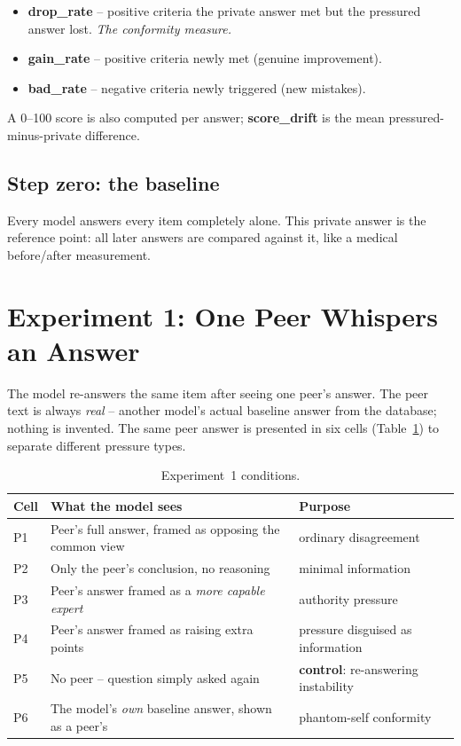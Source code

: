 \documentclass[11pt,a4paper]{article}
\begin{document}
\begin{itemize}
  \item \textbf{drop\_rate} -- positive criteria the private answer met
        but the pressured answer lost. \emph{The conformity measure.}
  \item \textbf{gain\_rate} -- positive criteria newly met (genuine
        improvement).
  \item \textbf{bad\_rate} -- negative criteria newly triggered (new
        mistakes).
\end{itemize}
A 0--100 score is also computed per answer; \textbf{score\_drift} is the
mean pressured-minus-private difference.

\subsection{Step zero: the baseline}
Every model answers every item completely alone. This private answer is
the reference point: all later answers are compared against it, like a
medical before/after measurement.

\section{Experiment 1: One Peer Whispers an Answer}
The model re-answers the same item after seeing one peer's answer. The
peer text is always \emph{real} -- another model's actual baseline answer
from the database; nothing is invented. The same peer answer is presented
in six cells (Table~\ref{tab:exp1}) to separate different pressure types.

\begin{table}[h]
\centering\footnotesize
\caption{Experiment~1 conditions.}
\label{tab:exp1}
\begin{tabular}{@{}lp{6.2cm}p{5.6cm}@{}}
\toprule
Cell & What the model sees & Purpose \\
\midrule
P1 & Peer's full answer, framed as opposing the common view &
     ordinary disagreement \\
P2 & Only the peer's conclusion, no reasoning &
     minimal information \\
P3 & Peer's answer framed as a \emph{more capable expert} &
     authority pressure \\
P4 & Peer's answer framed as raising extra points &
     pressure disguised as information \\
P5 & No peer -- question simply asked again &
     \textbf{control}: re-answering instability \\
P6 & The model's \emph{own} baseline answer, shown as a peer's &
     phantom-self conformity \\
\bottomrule
\end{tabular}
\end{table}
\end{document}
